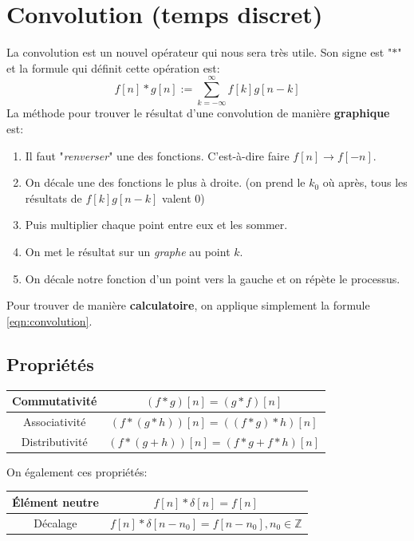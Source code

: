 \documentclass{report}
\begin{document}
\section{Convolution (temps discret)} \label{convo}
La convolution est un nouvel opérateur qui nous sera très utile. Son signe est "$\ast$" et la formule qui définit cette opération est:
\begin{equation} \label{eqn:convolution}
f[n] \ast g[n] := \sum_{k=-\infty}^{\infty} f[k]g[n-k] 
\end{equation}
La méthode pour trouver le résultat d'une convolution de manière \textbf{graphique} est:
\begin{enumerate}
\item Il faut "\textit{renverser}" une des fonctions. C'est-à-dire faire $f[n] \rightarrow f[-n]$.
\item On décale une des fonctions le plus à droite. (on prend le $k_0$ où après, tous les résultats de $f[k]g[n-k]$ valent $0$) 
\item Puis multiplier chaque point entre eux et les sommer.
\item On met le résultat sur un \textit{graphe} au point $k$.
\item On décale notre fonction d'un point vers la gauche et on répète le processus.
\end{enumerate}
Pour trouver de manière \textbf{calculatoire}, on applique simplement la formule \ref{eqn:convolution}.

\subsection{Propriétés}
\begin{center}
\begin{tabular}{c|c}
	Commutativité & $(f\ast g)[n] = (g \ast f)[n]$ \\
	\hline
	Associativité & $(f \ast (g \ast h))[n] = ((f \ast g) \ast h)[n]$ \\
	\hline
	Distributivité & $(f \ast (g + h))[n] = (f \ast g + f \ast h)[n]$ \\
\end{tabular}
\end{center}
On également ces propriétés:
\begin{center}
\begin{tabular}{c|c}
	Élément neutre & $f[n] \ast \delta[n] = f[n]$ \\
	\hline
	Décalage & $f[n] \ast \delta[n-n_0] = f[n-n_0], n_0 \in \mathbb{Z}$ \\
\end{tabular}
\end{center}
\end{document}
